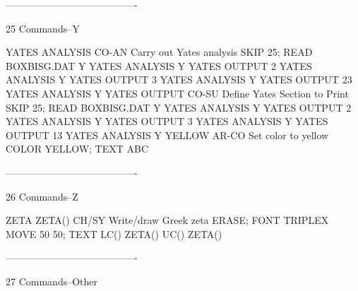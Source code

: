 ----------------------------------------
 
25
Commands--Y
 
YATES ANALYSIS              CO-AN Carry out Yates analysis
                                  SKIP 25; READ BOXBISG.DAT Y
                                  YATES ANALYSIS Y
                                  YATES OUTPUT 2
                                  YATES ANALYSIS Y
                                  YATES OUTPUT 3
                                  YATES ANALYSIS Y
                                  YATES OUTPUT 23
                                  YATES ANALYSIS Y
YATES OUTPUT                CO-SU  Define Yates Section to Print
                                  SKIP 25; READ BOXBISG.DAT Y
                                  YATES ANALYSIS Y
                                  YATES OUTPUT 2
                                  YATES ANALYSIS Y
                                  YATES OUTPUT 3
                                  YATES ANALYSIS Y
                                  YATES OUTPUT 13
                                  YATES ANALYSIS Y
YELLOW                      AR-CO Set color to yellow
                                  COLOR YELLOW; TEXT ABC
 
----------------------------------------
 
26
Commands--Z
 
ZETA
ZETA()                      CH/SY Write/draw Greek zeta
                                  ERASE; FONT TRIPLEX
                                  MOVE 50 50; TEXT LC() ZETA() UC() ZETA()
 
----------------------------------------
 
27
Commands--Other
 
